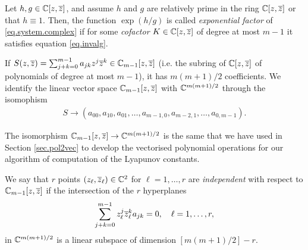 \begin{definicio}
Let $h,g\in\mathbb{C}[z,\overline{z}]$, and assume $h$ and $g$ are relatively prime in the ring $\mathbb{C}[z,\overline{z}]$ or that $h\equiv1$. Then, the function $\exp(h/g)$ is called \emph{exponential factor} of \eqref{eq.system.complex} if for some \emph{cofactor} $K\in\mathbb{C}[z,\overline{z}]$ of degree at most $m-1$ it satisfies equation \eqref{eq.invalg}.
\end{definicio}


If $S(z,\overline{z})=\sum_{j+k=0}^{m-1}a_{jk}z^j\overline{z}^k\in\mathbb{C}_{m-1}[z,\overline{z}]$ (i.e. the subring of $\mathbb{C}[z,\overline{z}]$ of polynomials of degree at most $m-1$), it has $m(m+1)/2$ coefficients. We identify the linear vector space $\mathbb{C}_{m-1}[z,\overline{z}]$ with $\mathbb{C}^{m(m+1)/2}$ through the isomophism
\begin{align*}
S\to(a_{00},a_{10},a_{01},\dots,a_{m-1,0},a_{m-2,1},\dots,a_{0,m-1}).
\end{align*}
\begin{observacio}
The isomorphism $\mathbb{C}_{m-1}[z,\overline{z}]\to\mathbb{C}^{m(m+1)/2}$ is the same that we have used in Section \ref{sec.pol2vec} to develop the vectorised polynomial operations for our algorithm of computation of the Lyapunov constants.
\end{observacio}

\begin{definicio}
We say that $r$ points $(z_\ell,\overline{z}_\ell)\in\mathbb{C}^2$ for $\ell=1,\dots,r$ are \emph{independent} with respect to $\mathbb{C}_{m-1}[z,\overline{z}]$ if the intersection of the $r$ hyperplanes 
\begin{align*}
\sum_{j+k=0}^{m-1}z_{\ell}^j\overline{z}_{\ell}^ka_{jk}=0,\quad\ell=1,\dots,r,
\end{align*}
in $\mathbb{C}^{m(m+1)/2}$ is a linear subspace of dimension $[m(m+1)/2]-r$.
\end{definicio}


